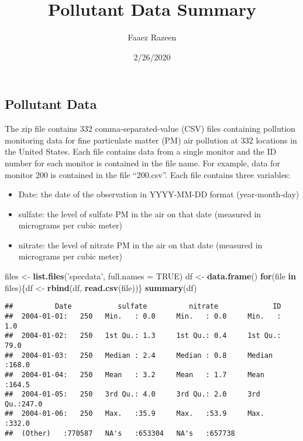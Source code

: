 \documentclass[
]{article}
\title{Pollutant Data Summary}
\author{Faaez Razeen}
\date{2/26/2020}
\newenvironment{Shaded}{\begin{snugshade}}{\end{snugshade}}
\newcommand{\ControlFlowTok}[1]{\textcolor[rgb]{0.13,0.29,0.53}{\textbf{#1}}}
\newcommand{\DataTypeTok}[1]{\textcolor[rgb]{0.13,0.29,0.53}{#1}}
\newcommand{\KeywordTok}[1]{\textcolor[rgb]{0.13,0.29,0.53}{\textbf{#1}}}
\newcommand{\NormalTok}[1]{#1}
\newcommand{\OtherTok}[1]{\textcolor[rgb]{0.56,0.35,0.01}{#1}}
\newcommand{\StringTok}[1]{\textcolor[rgb]{0.31,0.60,0.02}{#1}}
\providecommand{\tightlist}{%
  \setlength{\itemsep}{0pt}\setlength{\parskip}{0pt}}
\begin{document}
\maketitle

\hypertarget{pollutant-data}{%
\subsection{Pollutant Data}\label{pollutant-data}}

The zip file contains 332 comma-separated-value (CSV) files containing
pollution monitoring data for fine particulate matter (PM) air pollution
at 332 locations in the United States. Each file contains data from a
single monitor and the ID number for each monitor is contained in the
file name. For example, data for monitor 200 is contained in the file
``200.csv''. Each file contains three variables:

\begin{itemize}
\tightlist
\item
  Date: the date of the observation in YYYY-MM-DD format
  (year-month-day)
\item
  sulfate: the level of sulfate PM in the air on that date (measured in
  micrograms per cubic meter)
\item
  nitrate: the level of nitrate PM in the air on that date (measured in
  micrograms per cubic meter)
\end{itemize}

\begin{Shaded}
\begin{Highlighting}[]
\NormalTok{files <-}\StringTok{ }\KeywordTok{list.files}\NormalTok{(}\StringTok{'specdata'}\NormalTok{, }\DataTypeTok{full.names =} \OtherTok{TRUE}\NormalTok{)}
\NormalTok{df <-}\StringTok{ }\KeywordTok{data.frame}\NormalTok{()}
\ControlFlowTok{for}\NormalTok{(file }\ControlFlowTok{in}\NormalTok{ files)\{df <-}\StringTok{ }\KeywordTok{rbind}\NormalTok{(df, }\KeywordTok{read.csv}\NormalTok{(file))\}}
\KeywordTok{summary}\NormalTok{(df)}
\end{Highlighting}
\end{Shaded}

\begin{verbatim}
##          Date           sulfate          nitrate             ID       
##  2004-01-01:   250   Min.   : 0.0     Min.   : 0.0     Min.   :  1.0  
##  2004-01-02:   250   1st Qu.: 1.3     1st Qu.: 0.4     1st Qu.: 79.0  
##  2004-01-03:   250   Median : 2.4     Median : 0.8     Median :168.0  
##  2004-01-04:   250   Mean   : 3.2     Mean   : 1.7     Mean   :164.5  
##  2004-01-05:   250   3rd Qu.: 4.0     3rd Qu.: 2.0     3rd Qu.:247.0  
##  2004-01-06:   250   Max.   :35.9     Max.   :53.9     Max.   :332.0  
##  (Other)   :770587   NA's   :653304   NA's   :657738
\end{verbatim}
\end{document}
